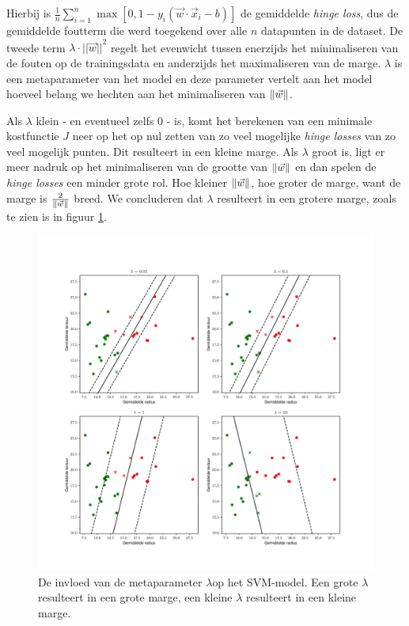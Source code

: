 \documentclass[TeamE-eindrapport]{subfiles}
\begin{document}
Hierbij is \(\frac{1}{n}\sum_{i=1}^n{\max{[0,1-y_i(\vec{w}\cdot\vec{x}_i-b)]}}\) de gemiddelde \textit{hinge loss}, dus de gemiddelde foutterm die werd toegekend over alle \(n\) datapunten in de dataset. De tweede term \(\lambda\cdot{||\vec{w}||}^2\) regelt het evenwicht tussen enerzijds het minimaliseren van de fouten op de trainingsdata en anderzijds het maximaliseren van de marge. \(\lambda\) is een metaparameter van het model en deze parameter vertelt aan het model hoeveel belang we hechten aan het minimaliseren van \(\left\| \vec{w} \right\|\). 

Als \(\lambda\) klein - en eventueel zelfs \(0\) - is, komt het berekenen van een minimale kostfunctie $J$ neer op het op nul zetten van zo veel mogelijke \textit{hinge losses} van zo veel mogelijk punten. Dit resulteert in een kleine marge. Als \(\lambda\) groot is, ligt er meer nadruk op het minimaliseren van de grootte van \(\left\| \vec{w} \right\|\) en dan spelen de \textit{hinge losses} een minder grote rol. Hoe kleiner \(\left\| \vec{w} \right\|\), hoe groter de marge, want de marge is \(\frac{2}{\left\| \vec{w} \right\|}\) breed. We concluderen dat \(\lambda\) resulteert in een grotere marge, zoals te zien is in figuur \ref{fig:lambda}.

\begin{figure}
	\centering
	\includegraphics[width=\textwidth]{lambda}
	\caption{De invloed van de metaparameter \(\lambda\)op het SVM-model. Een grote \(\lambda\) resulteert in een grote marge, een kleine \(\lambda\) resulteert in een kleine marge.}
	\label{fig:lambda}
\end{figure}
\end{document}
